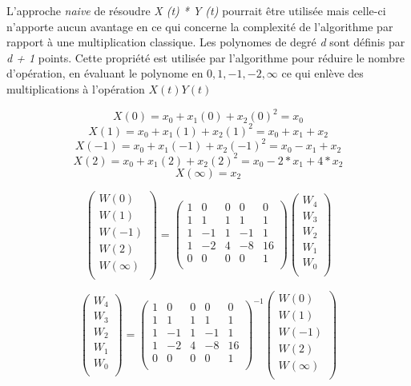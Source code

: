 \documentclass[letterpaper]{article}
\begin{document}
L'approche \emph{naive} de résoudre \emph{X (t) * Y (t)} pourrait être utilisée
mais celle-ci n'apporte aucun avantage en ce qui concerne la complexité de
l'algorithme par rapport à une multiplication classique.\cite{gmplib2014}
\newline
Les polynomes de degré \emph{d} sont définis par \emph{d + 1} points. Cette
propriété est utilisée par l'algorithme pour réduire le nombre d'opération, en
évaluant le polynome en $0, 1, -1, -2, \infty$ ce qui enlève des multiplications
à l'opération $X(t) Y(t)$\cite{wikitoom3}

    $$X (0) = x_{0} + x_{1} (0) + x_2 {(0)}^{2} = x_{0}$$
    $$X(1) = x_0 + x_1(1) + x_2{(1)}^2 = x_0 + x_1 + x_2$$
    $$X(-1) = x_0 + x_1(-1) + x_2{(-1)}^2 = x_0 - x_1 + x_2$$
    $$X(2) = x_0 + x_1(2) + x_2{(2)}^2 = x_0 - 2 * x_1 + 4 * x_2$$
    $$X(\infty) = x_2$$

$$
\begin{pmatrix}
  W (0) \\
  W (1) \\
  W (-1) \\
  W (2) \\
  W (\infty) \\
\end{pmatrix}
 =
\begin{pmatrix}
  1 & 0 & 0 & 0 & 0 \\
  1 & 1 & 1 & 1 & 1 \\
  1 &-1 & 1 &-1 & 1 \\
  1 &-2 & 4 &-8 &16 \\
  0 & 0 & 0 & 0 & 1 \\
\end{pmatrix}
\begin{pmatrix}
  W_4 \\
  W_3 \\
  W_2 \\
  W_1 \\
  W_0 \\
\end{pmatrix}
$$

$$
\begin{pmatrix}
  W_4 \\
  W_3 \\
  W_2 \\
  W_1 \\
  W_0 \\
 \end{pmatrix}
=
\begin{pmatrix}
  1 & 0 & 0 & 0 & 0 \\
  1 & 1 & 1 & 1 & 1 \\
  1 &-1 & 1 &-1 & 1 \\
  1 &-2 & 4 &-8 &16 \\
  0 & 0 & 0 & 0 & 1 \\
\end{pmatrix}^{-1}
\begin{pmatrix}
  W (0) \\
  W (1) \\
  W (-1) \\
  W (2) \\
  W (\infty) \\
\end{pmatrix}
$$
\end{document}
